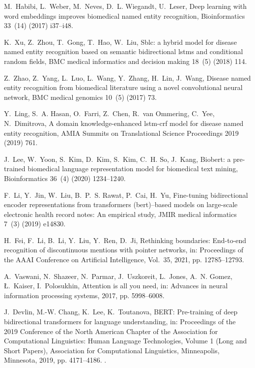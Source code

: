 \documentclass[preprint,12pt]{elsarticle}
\begin{document}
\begin{thebibliography}{10}
M.~Habibi, L.~Weber, M.~Neves, D.~L. Wiegandt, U.~Leser, Deep learning with
  word embeddings improves biomedical named entity recognition, Bioinformatics
  33~(14) (2017) i37--i48.

K.~Xu, Z.~Zhou, T.~Gong, T.~Hao, W.~Liu, Sblc: a hybrid model for disease named
  entity recognition based on semantic bidirectional lstms and conditional
  random fields, BMC medical informatics and decision making 18~(5) (2018) 114.

Z.~Zhao, Z.~Yang, L.~Luo, L.~Wang, Y.~Zhang, H.~Lin, J.~Wang, Disease named
  entity recognition from biomedical literature using a novel convolutional
  neural network, BMC medical genomics 10~(5) (2017) 73.

Y.~Ling, S.~A. Hasan, O.~Farri, Z.~Chen, R.~van Ommering, C.~Yee, N.~Dimitrova,
  A domain knowledge-enhanced lstm-crf model for disease named entity
  recognition, AMIA Summits on Translational Science Proceedings 2019 (2019)
  761.

J.~Lee, W.~Yoon, S.~Kim, D.~Kim, S.~Kim, C.~H. So, J.~Kang, Biobert: a
  pre-trained biomedical language representation model for biomedical text
  mining, Bioinformatics 36~(4) (2020) 1234--1240.

F.~Li, Y.~Jin, W.~Liu, B.~P.~S. Rawat, P.~Cai, H.~Yu, Fine-tuning bidirectional
  encoder representations from transformers (bert)--based models on large-scale
  electronic health record notes: An empirical study, JMIR medical informatics
  7~(3) (2019) e14830.

H.~Fei, F.~Li, B.~Li, Y.~Liu, Y.~Ren, D.~Ji, Rethinking boundaries: End-to-end
  recognition of discontinuous mentions with pointer networks, in: Proceedings
  of the AAAI Conference on Artificial Intelligence, Vol.~35, 2021, pp.
  12785--12793.

A.~Vaswani, N.~Shazeer, N.~Parmar, J.~Uszkoreit, L.~Jones, A.~N. Gomez,
  {\L}.~Kaiser, I.~Polosukhin, Attention is all you need, in: Advances in
  neural information processing systems, 2017, pp. 5998--6008.

J.~Devlin, M.-W. Chang, K.~Lee, K.~Toutanova, {BERT}: Pre-training of deep
  bidirectional transformers for language understanding, in: Proceedings of the
  2019 Conference of the North {A}merican Chapter of the Association for
  Computational Linguistics: Human Language Technologies, Volume 1 (Long and
  Short Papers), Association for Computational Linguistics, Minneapolis,
  Minnesota, 2019, pp. 4171--4186.
\newblock \href {https://doi.org/10.18653/v1/N19-1423}
  {}.


\end{thebibliography}
\end{document}
